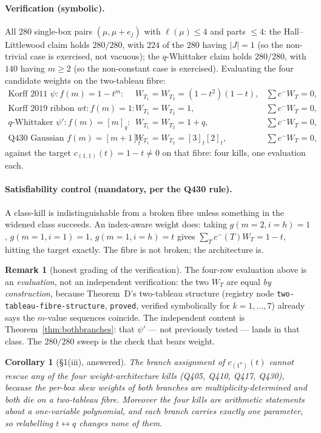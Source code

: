 \documentclass[11pt]{article}
\theoremstyle{plain}
\newtheorem{corollary}[theorem]{Corollary}
\theoremstyle{definition}
\newtheorem{remark}[theorem]{Remark}
\begin{document}
\paragraph{Verification (symbolic).} All $280$ single-box pairs $(\mu,\mu+e_j)$ with
$\ell(\mu)\le4$ and parts $\le4$: the Hall--Littlewood claim holds $280/280$, with
$224$ of the $280$ having $|J|=1$ (so the non-trivial case is exercised, not vacuous); the
$q$-Whittaker claim holds $280/280$, with $140$ having $m\ge2$ (so the non-constant case is
exercised). Evaluating the four candidate weights on the two-tableau fibre:
\[
\begin{array}{llll}
\text{Korff 2011 } \psi: f(m)=1-t^m: & W_{T_1}=W_{T_2}=(1-t^2)(1-t), & \textstyle\sum c^-W_T=0,\\
\text{Korff 2019 ribbon } wt: f(m)=1: & W_{T_1}=W_{T_2}=1, & \textstyle\sum c^-W_T=0,\\
q\text{-Whittaker } \psi': f(m)=[m]_q: & W_{T_1}=W_{T_2}=1+q, & \textstyle\sum c^-W_T=0,\\
\text{Q430 Gaussian } f(m)=[m+1]_t: & W_{T_1}=W_{T_2}=[3]_t[2]_t, & \textstyle\sum c^-W_T=0,
\end{array}
\]
against the target $c_{(1,1)}(t)=1-t\neq0$ on that fibre: four kills, one evaluation each.

\paragraph{Satisfiability control (mandatory, per the Q430 rule).} A class-kill is
indistinguishable from a broken fibre unless something in the widened class succeeds. An
index-aware weight does: taking $g(m{=}2,i{=}h)=1$, $g(m{=}1,i{=}1)=1$, $g(m{=}1,i{=}h)=t$
gives $\sum_T c^-(T)W_T = 1-t$, hitting the target exactly. The fibre is not broken; the
architecture is.

\begin{remark}[honest grading of the verification]
The four-row evaluation above is an \emph{evaluation}, not an independent verification: the
two $W_T$ are equal \emph{by construction}, because Theorem~D's two-tableau structure
(registry node \texttt{two-tableau-fibre-structure}, \texttt{proved}, verified symbolically
for $k=1,\dots,7$) already says the $m$-value sequences coincide. The independent content is
Theorem~\ref{thm:bothbranches}: that $\psi'$ --- not previously tested --- lands in that
class. The $280/280$ sweep is the check that bears weight.
\end{remark}

\begin{corollary}[\S1(iii), answered]\label{cor:moot}
The branch assignment of $c_{(1^n)}(t)$ cannot rescue any of the four weight-architecture
kills \emph{(Q405, Q410, Q417, Q430)}, because the per-box skew weights of both branches are
multiplicity-determined and both die on a two-tableau fibre. Moreover the four kills are
arithmetic statements about a one-variable polynomial, and each branch carries exactly one
parameter, so relabelling $t\leftrightarrow q$ changes none of them.
\end{corollary}
\end{document}

